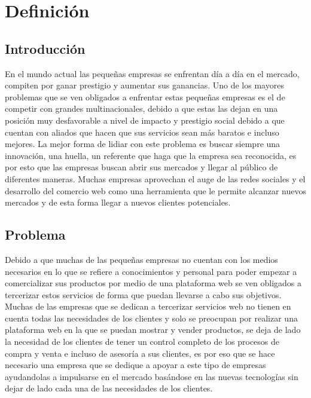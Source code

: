 \chapter{Definición}


\section{Introducción}

En el mundo actual las pequeñas empresas se enfrentan día a día en el mercado, compiten por ganar prestigio y aumentar sus ganancias. Uno de los mayores problemas que se ven obligados a enfrentar estas pequeñas empresas es el de competir con grandes multinacionales, debido a que estas las dejan en una posición muy desfavorable a nivel de impacto y prestigio social debido a que cuentan con aliados que hacen que sus servicios sean más baratos e incluso mejores.
\newline
La mejor forma de lidiar con este problema es buscar siempre una innovación, una huella, un referente que haga que la empresa sea reconocida, es por esto que las empresas buscan abrir sus mercados y llegar al público de diferentes maneras. Muchas empresas aprovechan el auge de las redes sociales y el desarrollo del comercio web como una herramienta que le permite alcanzar nuevos mercados y de esta forma llegar a nuevos clientes potenciales.
\newline


\section{Problema}

Debido a que muchas de las pequeñas empresas no cuentan con los medios necesarios en lo que se refiere a conocimientos y personal para poder empezar a comercializar sus productos por medio de una plataforma web se ven obligados a tercerizar estos servicios de forma que puedan llevarse a cabo sus objetivos.
\newline
Muchas de las empresas que se dedican a tercerizar servicios web no tienen en cuenta todas las necesidades de los clientes y solo se preocupan por realizar una plataforma web en la que se puedan mostrar y vender productos, se deja de lado la necesidad de los clientes de tener un control completo de los procesos de compra y venta e incluso de asesoría a sus clientes, es por eso que se hace necesario una empresa que se dedique a apoyar a este tipo de empresas ayudandolas a impulsarse en el mercado basándose en las nuevas tecnologías sin dejar de lado cada una de las necesidades de los clientes.

